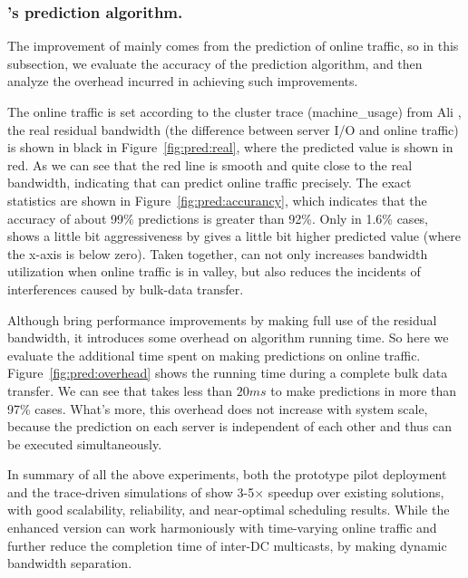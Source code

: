 {\subsubsection{\newname's prediction algorithm.}
\label{subsubsec:bdsplus:predict}

The improvement of \newname mainly comes from the prediction of online traffic, so in this subsection, we evaluate the accuracy of the prediction algorithm, and then analyze the overhead incurred in achieving such improvements.

 The online traffic is set according to the cluster trace (machine\_usage) from Ali \cite{datatrace}, the real residual bandwidth (the difference between server I/O and online traffic) is shown in black in Figure~\ref{fig:pred:real}, where the predicted value is shown in red. As we can see that the red line is smooth and quite close to the real bandwidth, indicating that \newname can predict online traffic precisely. The exact statistics are shown in Figure~\ref{fig:pred:accurancy}, which indicates that the accuracy of about 99\% predictions is greater than 92\%. Only in 1.6\% cases, \newname shows a little bit aggressiveness by gives a little bit higher predicted value (where the x-axis is below zero). Taken together, \newname can not only increases bandwidth utilization when online traffic is in valley, but also reduces the incidents of interferences caused by bulk-data transfer.

Although \newname bring performance improvements by making full use of the residual bandwidth, it introduces some overhead on algorithm running time. So here we evaluate the additional time spent on making predictions on online traffic. Figure~\ref{fig:pred:overhead} shows the running time during a complete bulk data transfer. We can see that \newname takes less than $20ms$ to make predictions in more than 97\% cases. What's more, this overhead does not increase with system scale, because the prediction on each server is independent of each other and thus can be executed simultaneously.

In summary of all the above experiments, both the prototype pilot deployment and the trace-driven simulations of \name show 3-5$\times$ speedup over existing solutions, with good scalability, reliability, and near-optimal scheduling results. While the enhanced version \newname can work harmoniously with time-varying online traffic and further reduce the completion time of inter-DC multicasts, by making dynamic bandwidth separation.
}

